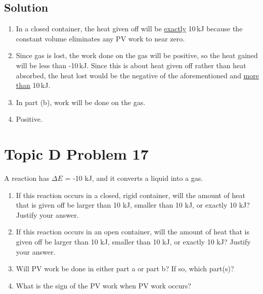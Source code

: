 \documentclass[10pt]{article}
\newcommand{\U}[1]{\underline{#1}}
\begin{document}
        \subsection{Solution}
        \begin{enumerate}[label=\alph*/]
            \item   In a closed container, the heat given off will be \U{exactly} 10\,\unit{\kilo\joule} because the constant volume eliminates any PV work to near zero.
            \item   Since gas is lost, the work done on the gas will be positive, so the heat gained will be less than -10\,\unit{\kilo\joule}. 
                Since this is about heat given off rather than heat absorbed, the heat lost would be the negative of the aforementioned and \underline{more than} 10\,\unit{\kilo\joule}. 
            \item   In part (b), work will be done on the gas.
            \item   Positive.
        \end{enumerate}

    \pagebreak
    \section{Topic D Problem 17}
        A reaction has $\Delta E$ = -10 kJ, and it converts a liquid into a gas.
        \begin{enumerate}[label=\alph*)]
            \item   If this reaction occurs in a closed, rigid container, will the amount of heat that is given off be larger than 10 kJ, smaller than 10 kJ, or exactly 10 kJ? Justify your answer.
            \item   If this reaction occurs in an open container, will the amount of heat that is given off be larger than 10 kJ, smaller than 10 kJ, or exactly 10 kJ? Justify your answer.
            \item   Will PV work be done in either part a or part b? If so, which part(s)?
            \item   What is the sign of the PV work when PV work occurs?
        \end{enumerate}
        
\end{document}
